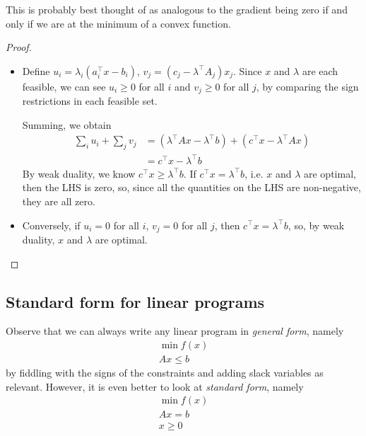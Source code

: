 \documentclass{../template/note}
\begin{document}
    \begin{remark*}
        This is probably best thought of as analogous to the gradient being zero if and only if we are at the minimum of a convex function.
    \end{remark*}
    
    \begin{proof}
        \begin{itemize}
            \item [$\implies$] Define $u_i = \lambda_i (a_i^\intercal x - b_i)$, $v_j = (c_j - \lambda^\intercal A_j)x_j$. Since $x$ and $\lambda$ are each feasible, we can see $u_i \geq 0$ for all $i$ and $v_j \geq 0$ for all $j$, by comparing the sign restrictions in each feasible set.
            
            Summing, we obtain
            \begin{align*}
                \sum_i u_i + \sum_j v_j &= (\lambda^\intercal Ax - \lambda^\intercal b) + (c^\intercal x - \lambda^\intercal Ax) \\
                &= c^\intercal x - \lambda^\intercal b
            \end{align*}
            By weak duality, we know $c^\intercal x \geq \lambda^\intercal b$. If $c^\intercal x = \lambda^\intercal b$, i.e. $x$ and $\lambda$ are optimal, then the LHS is zero, so, since all the quantities on the LHS are non-negative, they are all zero.
            \item [$\impliedby$] Conversely, if $u_i = 0$ for all $i$, $v_j = 0$ for all $j$, then $c^\intercal x = \lambda^\intercal b$, so, by weak duality, $x$ and $\lambda$ are optimal.            
        \end{itemize}
    \end{proof}
    
    \subsection{Standard form for linear programs}

    Observe that we can always write any linear program in \emph{general form}, namely
    \begin{align*}
        \min f(x) \\
        Ax \leq b
    \end{align*}
    by fiddling with the signs of the constraints and adding slack variables as relevant. However, it is even better to look at \emph{standard form}, namely
    \begin{align*}
        \min f(x) \\
        Ax = b \\
        x \geq 0
    \end{align*}
    
\end{document}
